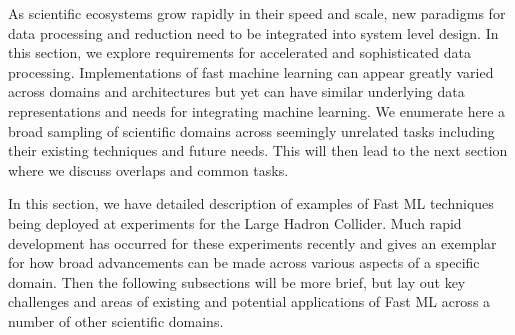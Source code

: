 As scientific ecosystems grow rapidly in their speed and scale, new paradigms for data processing and reduction need to be integrated into system level design.  
In this section, we explore requirements for accelerated and sophisticated data processing.  Implementations of fast machine learning can appear greatly varied across domains and architectures but yet can have similar underlying data representations and needs for integrating machine learning.  
We enumerate here a broad sampling of scientific domains across seemingly unrelated tasks including their existing techniques and future needs.  
This will then lead to the next section where we discuss overlaps and common tasks.

In this section, we have detailed description of examples of Fast ML techniques being deployed at experiments for the Large Hadron Collider.  
Much rapid development has occurred for these experiments recently and gives an exemplar for how broad advancements can be made across various aspects of a specific domain.  
Then the following subsections will be more brief, but lay out key challenges and areas of existing and potential applications of Fast ML across a number of other scientific domains.  



